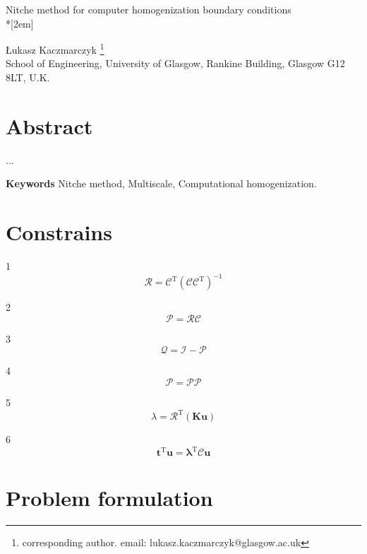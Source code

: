 \documentclass[a4paper,12pt]{article}
\begin{document}
\begin{center}

{\Large  Nitche method for computer homogenization boundary conditions}\\*[2em]

{\L}ukasz Kaczmarczyk \footnote{corresponding
author. email: lukasz.kaczmarczyk@glasgow.ac.uk} \\
School of Engineering, University of
Glasgow, Rankine Building, Glasgow G12 8LT, U.K.
\end{center}

\section*{Abstract}

...

{\bf Keywords} Nitche method, Multiscale, Computational homogenization.

\section{Constrains}

1
\begin{equation}
\mathcal{R} = \mathcal{C}^\textrm{T}(\mathcal{C}\mathcal{C}^\textrm{T})^{-1}
\end{equation}

2
\begin{equation}
\mathcal{P} = \mathcal{R}\mathcal{C}
\end{equation}

3
\begin{equation}
\mathcal{Q} = \mathcal{I}-\mathcal{P}
\end{equation}

4
\begin{equation}
\mathcal{P} = \mathcal{P}\mathcal{P}
\end{equation}

5
\begin{equation}
\lambda = \mathcal{R}^\textrm{T}(\mathbf{K}\mathbf{u})
\end{equation}

6
\begin{equation}
\mathbf{t}^\textrm{T}\mathbf{u} = {\boldsymbol\lambda}^\textrm{T}\mathcal{C}\mathbf{u}
\end{equation}

\section{Problem formulation}
\end{document}

